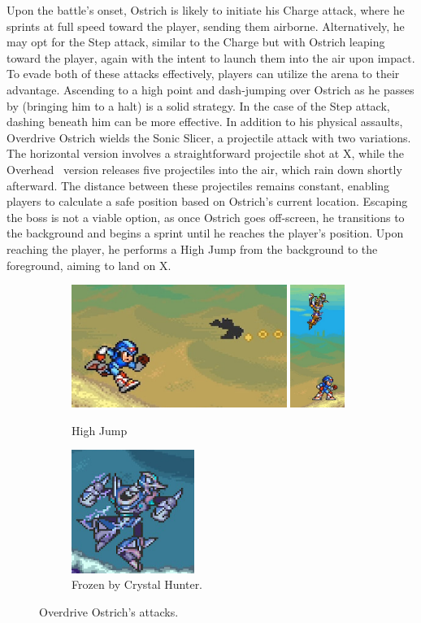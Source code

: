 Upon the battle's onset, Ostrich is likely to initiate his Charge attack, where he sprints at full speed toward the player, sending them airborne. Alternatively, he may opt for the Step attack, similar to the Charge but with Ostrich leaping toward the player, again with the intent to launch them into the air upon impact. To evade both of these attacks effectively, players can utilize the arena to their advantage. Ascending to a high point and dash-jumping over Ostrich as he passes by (bringing him to a halt) is a solid strategy. In the case of the Step attack, dashing beneath him can be more effective.
In addition to his physical assaults, Overdrive Ostrich wields the Sonic Slicer, a projectile attack with two variations. The horizontal version involves a straightforward projectile shot at X, while the Overhead~\cite{book:Compendium} version releases five projectiles into the air, which rain down shortly afterward. The distance between these projectiles remains constant, enabling players to calculate a safe position based on Ostrich's current location. Escaping the boss is not a viable option, as once Ostrich goes off-screen, he transitions to the background and begins a sprint until he reaches the player's position. Upon reaching the player, he performs a High Jump from the background to the foreground, aiming to land on X.
\begin{figure}[htp]
	\ContinuedFloat
	\centering
	\begin{subfigure}{\linewidth}
		\centering
		\includegraphics[height=4cm]{figures/X2/Overdrive_ostrich/Ostrich_background_2.png}
		\includegraphics[height=4cm]{figures/X2/Overdrive_ostrich/Ostrich_background.png}
		\caption{High Jump}
	\end{subfigure}
	\begin{subfigure}{0.4\linewidth}
		\centering
		\includegraphics[height= 4cm]{figures/X2/Overdrive_ostrich/Ostrich_freeze.png}
		\caption{Frozen by Crystal Hunter.}
	\end{subfigure}
	\caption{Overdrive Ostrich's attacks.}	
\end{figure}
